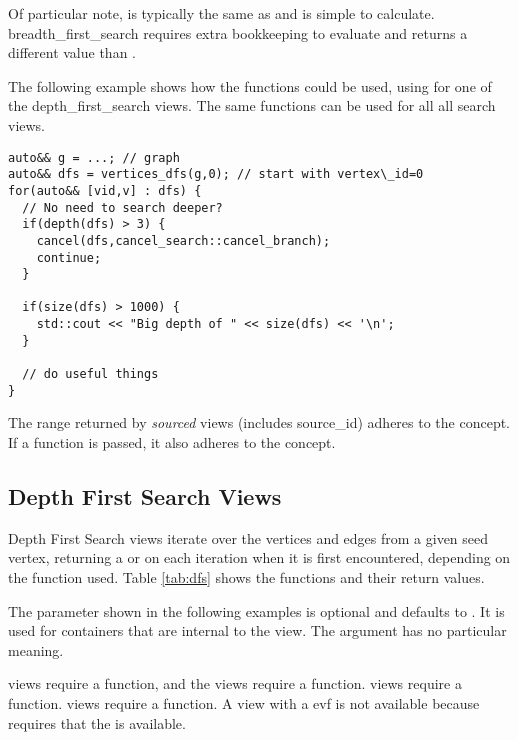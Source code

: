 Of particular note,  is typically the same as  and is simple to calculate. breadth\_first\_search requires extra bookkeeping to evaluate  and returns a different value than .

The following example shows how the functions  could be used, using  for one of the depth\_first\_search views. The same functions can be used for all all search views.
\begin{lstlisting}
auto&& g = ...; // graph
auto&& dfs = vertices_dfs(g,0); // start with vertex\_id=0
for(auto&& [vid,v] : dfs) {
  // No need to search deeper?
  if(depth(dfs) > 3) {
    cancel(dfs,cancel_search::cancel_branch);
    continue;
  }
  
  if(size(dfs) > 1000) {
    std::cout << "Big depth of " << size(dfs) << '\n';
  }
  
  // do useful things
}
\end{lstlisting}

The range returned by \textit{sourced} views (includes source\_id) adheres to the   concept. If a 
 function is passed, it also adheres to the  concept.

\subsection{Depth First Search Views}

Depth First Search views iterate over the vertices and edges from a given seed vertex, returning a  or  on each iteration when it is first encountered, depending on the function used. 
Table \ref{tab:dfs} shows the functions and their return values.

The  parameter shown in the following examples is optional and defaults to . It is used for containers 
that are internal to the view. The  argument has no particular meaning.

 views require a  function, and the  views require a  function.
 views require a  function.  views require a  function. 
A  view with a evf is not available because  requires that the  is available.

